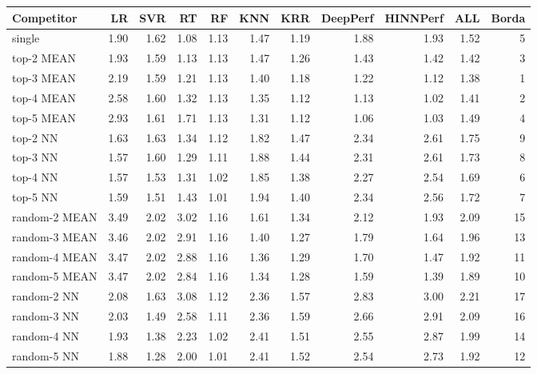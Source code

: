 \begin{tabular}{lrrrrrrrrrr}
\toprule
Competitor & LR & SVR & RT & RF & KNN & KRR & DeepPerf & HINNPerf & ALL & Borda \\
\midrule
single & 1.90 & 1.62 & 1.08 & 1.13 & 1.47 & 1.19 & 1.88 & 1.93 & 1.52 & 5 \\
top-2 MEAN & 1.93 & 1.59 & 1.13 & 1.13 & 1.47 & 1.26 & 1.43 & 1.42 & 1.42 & 3 \\
top-3 MEAN & 2.19 & 1.59 & 1.21 & 1.13 & 1.40 & 1.18 & 1.22 & 1.12 & 1.38 & 1 \\
top-4 MEAN & 2.58 & 1.60 & 1.32 & 1.13 & 1.35 & 1.12 & 1.13 & 1.02 & 1.41 & 2 \\
top-5 MEAN & 2.93 & 1.61 & 1.71 & 1.13 & 1.31 & 1.12 & 1.06 & 1.03 & 1.49 & 4 \\
top-2 NN & 1.63 & 1.63 & 1.34 & 1.12 & 1.82 & 1.47 & 2.34 & 2.61 & 1.75 & 9 \\
top-3 NN & 1.57 & 1.60 & 1.29 & 1.11 & 1.88 & 1.44 & 2.31 & 2.61 & 1.73 & 8 \\
top-4 NN & 1.57 & 1.53 & 1.31 & 1.02 & 1.85 & 1.38 & 2.27 & 2.54 & 1.69 & 6 \\
top-5 NN & 1.59 & 1.51 & 1.43 & 1.01 & 1.94 & 1.40 & 2.34 & 2.56 & 1.72 & 7 \\
random-2 MEAN & 3.49 & 2.02 & 3.02 & 1.16 & 1.61 & 1.34 & 2.12 & 1.93 & 2.09 & 15 \\
random-3 MEAN & 3.46 & 2.02 & 2.91 & 1.16 & 1.40 & 1.27 & 1.79 & 1.64 & 1.96 & 13 \\
random-4 MEAN & 3.47 & 2.02 & 2.88 & 1.16 & 1.36 & 1.29 & 1.70 & 1.47 & 1.92 & 11 \\
random-5 MEAN & 3.47 & 2.02 & 2.84 & 1.16 & 1.34 & 1.28 & 1.59 & 1.39 & 1.89 & 10 \\
random-2 NN & 2.08 & 1.63 & 3.08 & 1.12 & 2.36 & 1.57 & 2.83 & 3.00 & 2.21 & 17 \\
random-3 NN & 2.03 & 1.49 & 2.58 & 1.11 & 2.36 & 1.59 & 2.66 & 2.91 & 2.09 & 16 \\
random-4 NN & 1.93 & 1.38 & 2.23 & 1.02 & 2.41 & 1.51 & 2.55 & 2.87 & 1.99 & 14 \\
random-5 NN & 1.88 & 1.28 & 2.00 & 1.01 & 2.41 & 1.52 & 2.54 & 2.73 & 1.92 & 12 \\
\bottomrule
\end{tabular}
